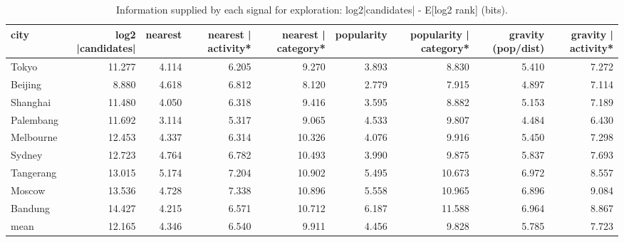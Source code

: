 \begin{table}[t]
\centering\small
\caption{Information supplied by each signal for exploration: log2|candidates| - E[log2 rank] (bits).}
\label{tab:A8_bits}
\begin{tabular}{lrrrrrrrr}
\toprule
city & log2 |candidates| & nearest & nearest | activity* & nearest | category* & popularity & popularity | category* & gravity (pop/dist) & gravity | activity* \\
\midrule
Tokyo & 11.277 & 4.114 & 6.205 & 9.270 & 3.893 & 8.830 & 5.410 & 7.272 \\
Beijing & 8.880 & 4.618 & 6.812 & 8.120 & 2.779 & 7.915 & 4.897 & 7.114 \\
Shanghai & 11.480 & 4.050 & 6.318 & 9.416 & 3.595 & 8.882 & 5.153 & 7.189 \\
Palembang & 11.692 & 3.114 & 5.317 & 9.065 & 4.533 & 9.807 & 4.484 & 6.430 \\
Melbourne & 12.453 & 4.337 & 6.314 & 10.326 & 4.076 & 9.916 & 5.450 & 7.298 \\
Sydney & 12.723 & 4.764 & 6.782 & 10.493 & 3.990 & 9.875 & 5.837 & 7.693 \\
Tangerang & 13.015 & 5.174 & 7.204 & 10.902 & 5.495 & 10.673 & 6.972 & 8.557 \\
Moscow & 13.536 & 4.728 & 7.338 & 10.896 & 5.558 & 10.965 & 6.896 & 9.084 \\
Bandung & 14.427 & 4.215 & 6.571 & 10.712 & 6.187 & 11.588 & 6.964 & 8.867 \\
mean & 12.165 & 4.346 & 6.540 & 9.911 & 4.456 & 9.828 & 5.785 & 7.723 \\
\bottomrule
\end{tabular}
\end{table}
